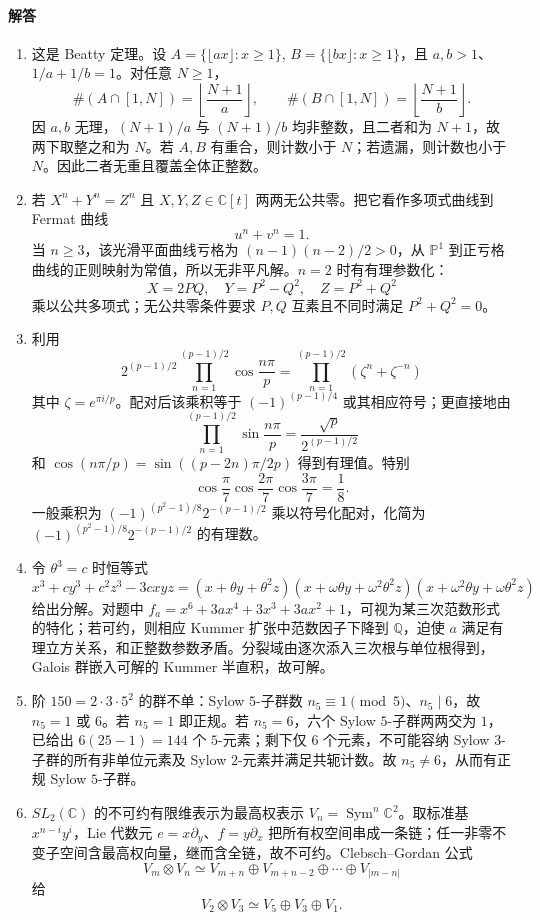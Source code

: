 \documentclass[UTF8,12pt]{ctexart}
\begin{document}
\paragraph{解答}
\begin{enumerate}[label=\textbf{\arabic*.},leftmargin=2.2em]
\item 这是 Beatty 定理。设 \(A=\{\lfloor ax\rfloor:x\ge1\}\), \(B=\{\lfloor bx\rfloor:x\ge1\}\)，且 \(a,b>1\)、\(1/a+1/b=1\)。对任意 \(N\ge1\)，
\[
\#(A\cap[1,N])=\left\lfloor\frac{N+1}{a}\right\rfloor,\qquad
\#(B\cap[1,N])=\left\lfloor\frac{N+1}{b}\right\rfloor .
\]
因 \(a,b\) 无理，\((N+1)/a\) 与 \((N+1)/b\) 均非整数，且二者和为 \(N+1\)，故两下取整之和为 \(N\)。若 \(A,B\) 有重合，则计数小于 \(N\)；若遗漏，则计数也小于 \(N\)。因此二者无重且覆盖全体正整数。
\item 若 \(X^n+Y^n=Z^n\) 且 \(X,Y,Z\in\mathbb C[t]\) 两两无公共零。把它看作多项式曲线到 Fermat 曲线
\[
u^n+v^n=1.
\]
当 \(n\ge3\)，该光滑平面曲线亏格为 \((n-1)(n-2)/2>0\)，从 \(\mathbb P^1\) 到正亏格曲线的正则映射为常值，所以无非平凡解。\(n=2\) 时有有理参数化：
\[
X=2PQ,\quad Y=P^2-Q^2,\quad Z=P^2+Q^2
\]
乘以公共多项式；无公共零条件要求 \(P,Q\) 互素且不同时满足 \(P^2+Q^2=0\)。
\item 利用
\[
2^{(p-1)/2}\prod_{n=1}^{(p-1)/2}\cos\frac{n\pi}{p}
=\prod_{n=1}^{(p-1)/2}(\zeta^n+\zeta^{-n})
\]
其中 \(\zeta=e^{\pi i/p}\)。配对后该乘积等于 \((-1)^{(p-1)/4}\) 或其相应符号；更直接地由
\[
\prod_{n=1}^{(p-1)/2}\sin\frac{n\pi}{p}=\frac{\sqrt p}{2^{(p-1)/2}}
\]
和 \(\cos(n\pi/p)=\sin((p-2n)\pi/2p)\) 得到有理值。特别
\[
\cos\frac\pi7\cos\frac{2\pi}7\cos\frac{3\pi}7=\frac18.
\]
一般乘积为 \((-1)^{(p^2-1)/8}2^{-(p-1)/2}\) 乘以符号化配对，化简为 \((-1)^{(p^2-1)/8}2^{-(p-1)/2}\) 的有理数。
\item 令 \(\theta^3=c\) 时恒等式
\[
x^3+c y^3+c^2z^3-3cxyz=(x+\theta y+\theta^2z)(x+\omega\theta y+\omega^2\theta^2z)(x+\omega^2\theta y+\omega\theta^2z)
\]
给出分解。对题中 \(f_a=x^6+3ax^4+3x^3+3ax^2+1\)，可视为某三次范数形式的特化；若可约，则相应 Kummer 扩张中范数因子下降到 \(\mathbb Q\)，迫使 \(a\) 满足有理立方关系，和正整数参数矛盾。分裂域由逐次添入三次根与单位根得到，Galois 群嵌入可解的 Kummer 半直积，故可解。
\item 阶 \(150=2\cdot3\cdot5^2\) 的群不单：Sylow \(5\)-子群数 \(n_5\equiv1\pmod5\)、\(n_5\mid6\)，故 \(n_5=1\) 或 \(6\)。若 \(n_5=1\) 即正规。若 \(n_5=6\)，六个 Sylow \(5\)-子群两两交为 \(1\)，已给出 \(6(25-1)=144\) 个 \(5\)-元素；剩下仅 \(6\) 个元素，不可能容纳 Sylow \(3\)-子群的所有非单位元素及 Sylow \(2\)-元素并满足共轭计数。故 \(n_5\ne6\)，从而有正规 Sylow \(5\)-子群。
\item \(SL_2(\mathbb C)\) 的不可约有限维表示为最高权表示 \(V_n=\operatorname{Sym}^n\mathbb C^2\)。取标准基 \(x^{n-i}y^i\)，Lie 代数元 \(e=x\partial_y\)、\(f=y\partial_x\) 把所有权空间串成一条链；任一非零不变子空间含最高权向量，继而含全链，故不可约。Clebsch--Gordan 公式
\[
V_m\otimes V_n\simeq V_{m+n}\oplus V_{m+n-2}\oplus\cdots\oplus V_{|m-n|}
\]
给
\[
V_2\otimes V_3\simeq V_5\oplus V_3\oplus V_1.
\]
\end{enumerate}
\end{document}
